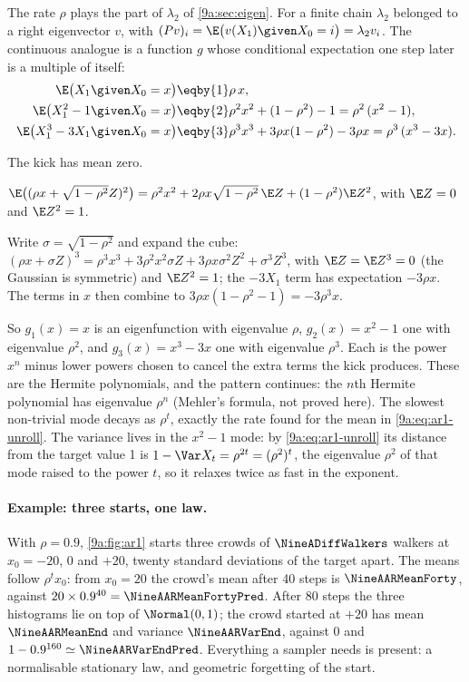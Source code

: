 The rate $\rho$ plays the part of $\lambda_2$ of \cref{9a:sec:eigen}. For a finite chain $\lambda_2$
belonged to a right eigenvector $v$, with $(Pv)_i=\E\bigl(v(X_1)\given X_0=i\bigr)=\lambda_2v_i$.
The continuous analogue is a function $g$ whose conditional expectation one step later is a
multiple of itself:
\begin{align}
  \E\bigl(X_{1}\given X_0=x\bigr)
  &\eqby{1}\rho\,x,
  \nonumber\\
  \E\bigl(X_{1}^2-1\given X_0=x\bigr)
  &\eqby{2}\rho^2x^2+(1-\rho^2)-1
  =\rho^2\,(x^2-1),
  \nonumber\\
  \E\bigl(X_{1}^3-3X_1\given X_0=x\bigr)
  &\eqby{3}\rho^3x^3+3\rho x(1-\rho^2)-3\rho x
  =\rho^3\,(x^3-3x).
  \label{9a:eq:ar1-eigen}
\end{align}
\begin{explain}
  \item The kick has mean zero.
  \item $\E\bigl((\rho x+\sqrt{1-\rho^2}Z)^2\bigr)=\rho^2x^2+2\rho x\sqrt{1-\rho^2}\,\E Z
        +(1-\rho^2)\E Z^2$, with $\E Z=0$ and $\E Z^2=1$.
  \item Write $\sigma=\sqrt{1-\rho^2}$ and expand the cube:
        $(\rho x+\sigma Z)^3=\rho^3x^3+3\rho^2x^2\sigma Z+3\rho x\sigma^2Z^2+\sigma^3Z^3$, with
        $\E Z=\E Z^3=0$ (the Gaussian is symmetric) and $\E Z^2=1$; the $-3X_1$ term has
        expectation $-3\rho x$. The terms in $x$ then combine to $3\rho x(1-\rho^2-1)=-3\rho^3x$.
\end{explain}
So $g_1(x)=x$ is an eigenfunction with eigenvalue $\rho$, $g_2(x)=x^2-1$ one with eigenvalue
$\rho^2$, and $g_3(x)=x^3-3x$ one with eigenvalue $\rho^3$. Each is the power $x^n$ minus
lower powers chosen to cancel the extra terms the kick produces. These are the Hermite polynomials, and the
pattern continues: the $n$th Hermite polynomial has eigenvalue $\rho^n$ (Mehler's formula, not
proved here). The slowest non-trivial mode decays as $\rho^t$, exactly the rate found for the
mean in \eqref{9a:eq:ar1-unroll}. The variance lives in the $x^2-1$ mode: by
\eqref{9a:eq:ar1-unroll} its distance from the target value 1 is $1-\Var X_t=\rho^{2t}=(\rho^2)^t$,
the eigenvalue $\rho^2$ of that mode raised to the power $t$, so it relaxes twice as fast in the
exponent.

\paragraph{Example: three starts, one law.}
With $\rho=0.9$, \cref{9a:fig:ar1} starts three crowds of $\NineADiffWalkers$ walkers at
$x_0=-20$, $0$ and $+20$, twenty standard deviations of the target apart. The means follow
$\rho^tx_0$: from $x_0=20$ the crowd's mean after 40 steps is $\NineAARMeanForty$, against
$20\times0.9^{40}=\NineAARMeanFortyPred$. After 80 steps the three histograms lie on top of
$\Normal(0,1)$; the crowd started at $+20$ has mean $\NineAARMeanEnd$ and variance
$\NineAARVarEnd$, against $0$ and $1-0.9^{160}\simeq\NineAARVarEndPred$. Everything a sampler needs
is present: a normalisable stationary law, and geometric forgetting of the start.

